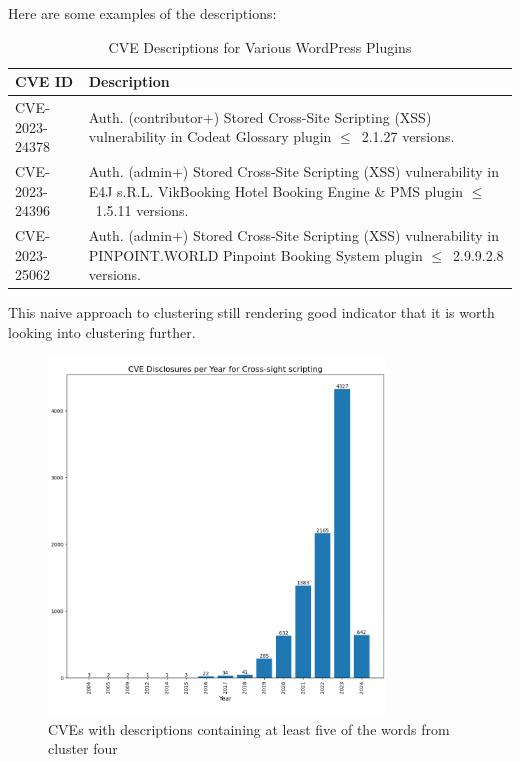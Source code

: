 \documentclass[12pt]{article}
\begin{document}
Here are some examples of the descriptions:

\begin{table}[h]
	\centering
	\begin{tabular}{|p{}|p{}|}
		\hline
		\textbf{CVE ID} & \textbf{Description}                                                    \\
		\hline

		CVE-2023-24378  & Auth. (contributor+) Stored Cross-Site Scripting (XSS) vulnerability in
		Codeat Glossary plugin $\leq$~2.1.27 versions.                                            \\

		\hline

		CVE-2023-24396  & Auth. (admin+) Stored Cross-Site Scripting (XSS) vulnerability in E4J
		s.R.L. VikBooking Hotel Booking Engine \& PMS plugin $\leq$~1.5.11 versions.              \\

		\hline

		CVE-2023-25062  & Auth. (admin+) Stored Cross-Site Scripting (XSS) vulnerability in
		PINPOINT.WORLD Pinpoint Booking System plugin $\leq$~2.9.9.2.8 versions.                  \\

		\hline
	\end{tabular}
	\caption{CVE Descriptions for Various WordPress Plugins}
	\label{tab:cve-descriptions}
\end{table}

This naive approach to clustering still rendering   good indicator that it is worth looking into clustering further.

\begin{figure}[H]
	\centering

	\includegraphics[width=0.8\textwidth]{figures/cross_site_per_year.pdf}
	\caption{\label{fig:cross_site_per_year}CVEs with descriptions containing at least five of the
		words from cluster four}
\end{figure}
\end{document}
